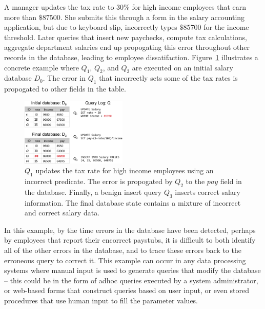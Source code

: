 
\begin{example}\label{ex:telco}
  A manager updates the tax rate to $30\%$ for high income employees that earn more than $\$87500$.
  She submits this through a form in the salary accounting application, 
  but due to keyboard slip, incorrectly types $\$85700$ for the income threshold.  
  Later queries that insert new paychecks, compute tax calculations,
  aggregate department salaries end up propogating this error throughout other records in the database, leading to
  employee dissatifaction.  Figure~\ref{fig:example} illustrates a concrete example where $Q_1$, $Q_2$, and $Q_3$ are executed on an 
  initial salary database $D_0$.  The error in $Q_1$ that incorrectly sets some of the tax rates is propogated to other fields in the table.
\end{example}

\begin{figure}[t]
    \centering
        \includegraphics[width=0.45\textwidth]{figures/example}
    \caption{$Q_1$ updates the tax rate for high income employees using an incorrect predicate.  
      The error is propogated by $Q_2$ to the $pay$ field in the database.
      Finally, a benign insert query $Q_3$ inserts correct salary information. 
      The final database state contains a mixture of incorrect and correct salary data.
    }
    \label{fig:example}
\end{figure}


In this example, by the time errors in the database have been detected, 
perhaps by employees that report their encorrect paystubs, it is difficult 
to both identify all of the other errors in the database, and to trace these errors back to the erroneous query to correct it.
This example can occur in any data processing systems where manual input is used to generate queries that modify the database --
this could be in the form of adhoc queries executed by a system administrator, or web-based forms that construct queries based
on user input, or even stored procedures that use human input to fill the parameter values.
